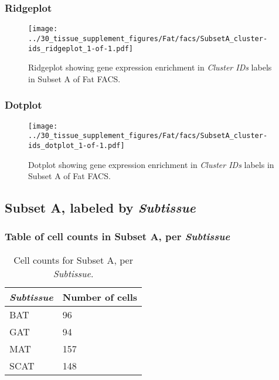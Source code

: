 \clearpage

\subsubsection{Ridgeplot}
\begin{figure}[h]
\centering
\texttt{[image: ../30\_tissue\_supplement\_figures/Fat/facs/SubsetA\_cluster-ids\_ridgeplot\_1-of-1.pdf]}

\caption{ Ridgeplot  showing gene expression enrichment in \emph{Cluster IDs} labels in Subset A of Fat FACS. }
\end{figure}


\clearpage

\subsubsection{Dotplot}
\begin{figure}[h]
\centering
\texttt{[image: ../30\_tissue\_supplement\_figures/Fat/facs/SubsetA\_cluster-ids\_dotplot\_1-of-1.pdf]}

\caption{ Dotplot  showing gene expression enrichment in \emph{Cluster IDs} labels in Subset A of Fat FACS. }
\end{figure}


\clearpage

\subsection{Subset A, labeled by \emph{Subtissue}}
\subsubsection{Table of cell counts in Subset A, per \emph{Subtissue}}\begin{table}[h]
\centering
\label{my-label}
\begin{tabular}{@{}ll@{}}
\toprule

\emph{Subtissue}& Number of cells \\ \midrule
BAT & 96 \\

GAT & 94 \\

MAT & 157 \\

SCAT & 148 \\
\bottomrule
\end{tabular}
\caption{Cell counts for Subset A, per \emph{Subtissue}.}
\end{table}

